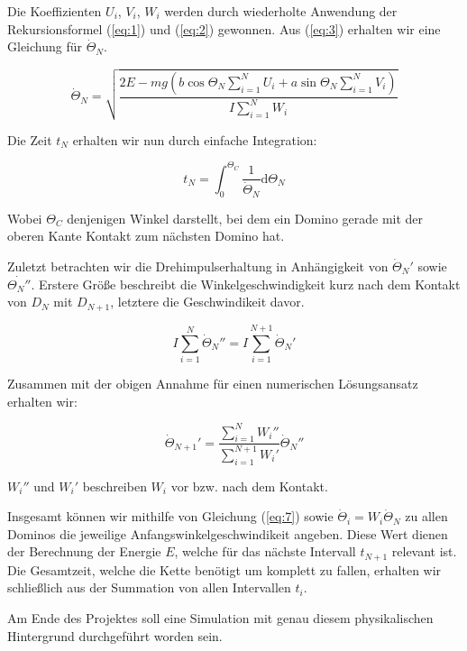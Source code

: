 Die Koeffizienten $U_i$, $V_i$, $W_i$ werden durch wiederholte Anwendung der
Rekursionsformel (\ref{eq:1}) und (\ref{eq:2}) gewonnen. Aus (\ref{eq:3})
erhalten wir eine Gleichung für $\dot{\Theta}_N$.

\begin{equation}
    \dot{\Theta}_N = \sqrt{\frac{2E - mg
        \left( b\cos{\Theta_N} \sum_{i=1}^N U_i
        + a\sin{\Theta_N} \sum_{i=1}^N V_i \right)}
    {I \sum_{i=1}^N W_i}}
    \label{eq:4}
\end{equation}

\noindent
Die Zeit $t_N$ erhalten wir nun durch einfache Integration:

\begin{equation}
    t_N = \int_0^{\Theta_C} \frac{1}{\dot{\Theta}_N} \mathrm{d}\Theta_N
    \label{eq:5}
\end{equation}

Wobei $\Theta_C$ denjenigen Winkel darstellt, bei dem ein Domino gerade mit der
oberen Kante Kontakt zum nächsten Domino hat.

Zuletzt betrachten wir die Drehimpulserhaltung in Anhängigkeit von
$\dot{\Theta}_N'$ sowie $\dot{\Theta_N''}$. Erstere Größe beschreibt die
Winkelgeschwindigkeit kurz nach dem Kontakt von $D_N$ mit $D_{N+1}$, letztere
die Geschwindikeit davor.

\begin{equation}
    I \displaystyle\sum_{i=1}^N \dot{\Theta}_N'' =
    I \displaystyle\sum_{i=1}^{N+1} \dot{\Theta}_N'
    \label{eq:6}
\end{equation}

Zusammen mit der obigen Annahme für einen numerischen Lösungsansatz erhalten
wir:

\begin{equation}
    \dot{\Theta}_{N+1}' =
        \frac{\sum_{i=1}^{N} W_i''}{\sum_{i=1}^{N+1} W_i'}
        \dot{\Theta}_N''
    \label{eq:7}
\end{equation}

$W_i''$ und $W_i'$ beschreiben $W_i$ vor bzw. nach dem Kontakt.

Insgesamt können wir mithilfe von Gleichung (\ref{eq:7}) sowie $\dot{\Theta}_i
= W_i\dot{\Theta}_N$ zu allen Dominos die jeweilige Anfangswinkelgeschwindikeit
angeben. Diese Wert dienen der Berechnung der Energie $E$, welche für das
nächste Intervall $t_{N+1}$ relevant ist.
Die Gesamtzeit, welche die Kette benötigt um komplett zu fallen, erhalten wir
schließlich aus der Summation von allen Intervallen $t_i$.

Am Ende des Projektes soll eine Simulation mit genau diesem physikalischen
Hintergrund durchgeführt worden sein.
